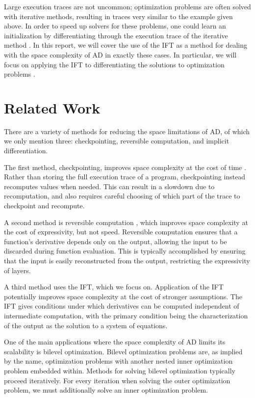 \documentclass[11pt]{article}
\begin{document}
Large execution traces are not uncommon;
optimization problems are often solved with iterative methods,
resulting in traces very similar to the example given above.
In order to speed up solvers for these problems,
one could learn an initialization by differentiating through the
execution trace of the iterative method \citep{finn2017maml,kim2018savi,neuralinit}.
In this report, we will cover the use of the IFT
as a method for dealing with the space complexity of AD in exactly these cases.
In particular,
we will focus on applying the IFT to differentiating the solutions to optimization problems
\citep{optnet,agrawal2019diffcvx}.

\section{Related Work}
There are a variety of methods for reducing the space limitations of AD,
of which we only mention three: checkpointing, reversible computation, and implicit differentiation.

The first method, checkpointing, improves space complexity at the cost of time \citep{griewank2008autodiff}.
Rather than storing the full execution trace of a program,
checkpointing instead recomputes values when needed.
This can result in a slowdown due to recomputation,
and also requires careful choosing of which part of the trace to checkpoint and recompute.

A second method is reversible computation \citep{maclaurin2015reversible,gomez2017reversible},
which improves space complexity at the cost of expressivity, but not speed.
Reversible computation ensures that a function's derivative depends only on the output,
allowing the input to be discarded during function evaluation.
This is typically accomplished by ensuring that the input is easily reconstructed from the output,
restricting the expressivity of layers.

A third method uses the IFT, which we focus on.
Application of the IFT potentially improves space complexity at the cost of stronger assumptions.
The IFT gives conditions under which derivatives can be computed independent of
intermediate computation,
with the primary condition being the characterization of the output as the solution
to a system of equations.

One of the main applications where the space complexity of AD limits its scalability
is bilevel optimization.
Bilevel optimization problems are, as implied by the name,
optimization problems with another nested inner optimization problem embedded within.
Methods for solving bilevel optimization typically proceed iteratively.
For every iteration when solving the outer optimization problem,
we must additionally solve an inner optimization problem.
\end{document}
